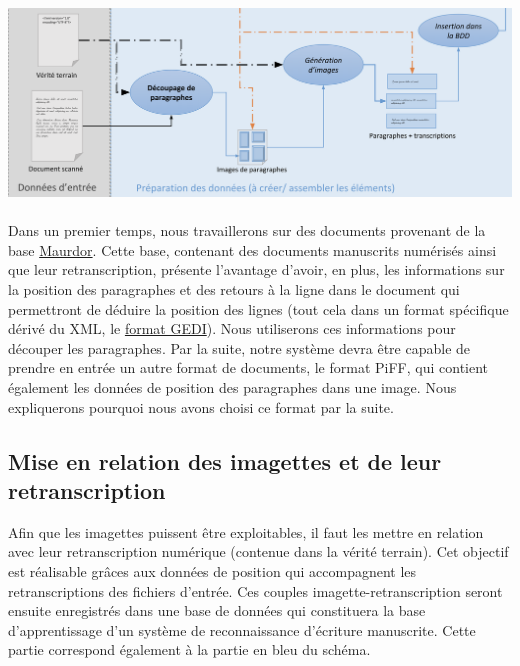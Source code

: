 \paragraph{}
\begin{mdframed}[frametitle={Figure 5 : Partie traitement des données du projet (sans détection de lignes)}, innerbottommargin=10]
\begin{center}
\includegraphics[width=\linewidth]{sans-detection.png}
\end{center}
\end{mdframed}

\paragraph{}
Dans un premier temps, nous travaillerons sur des documents provenant de la base
\href{http://www.maurdor-campaign.org/}{Maurdor}. Cette base, contenant des documents manuscrits numérisés
ainsi que leur retranscription, présente l’avantage d’avoir, en plus, les informations sur la position des
paragraphes et des retours à la ligne dans le document qui permettront de déduire la position des lignes
(tout cela dans un format spécifique dérivé du XML, le
\href{https://lampsrv02.umiacs.umd.edu/projdb/project.php?id=53}{format GEDI}). Nous utiliserons ces informations
pour découper les paragraphes. Par la suite, notre système devra être capable de prendre en entrée un autre
format de documents, le format PiFF\cite{piff:2017}, qui contient également les données de position des
paragraphes dans une image. Nous expliquerons pourquoi nous avons choisi ce format par la suite.

\subsection{Mise en relation des imagettes et de leur retranscription}

Afin que les imagettes puissent être exploitables, il faut les mettre en relation avec leur retranscription
numérique (contenue dans la vérité terrain). Cet objectif est réalisable grâces aux données de position qui accompagnent
les retranscriptions des fichiers d’entrée. Ces couples imagette-retranscription seront ensuite enregistrés
dans une base de données qui constituera la base d’apprentissage d’un système de reconnaissance d’écriture
manuscrite. Cette partie correspond également à la partie en bleu du schéma.

